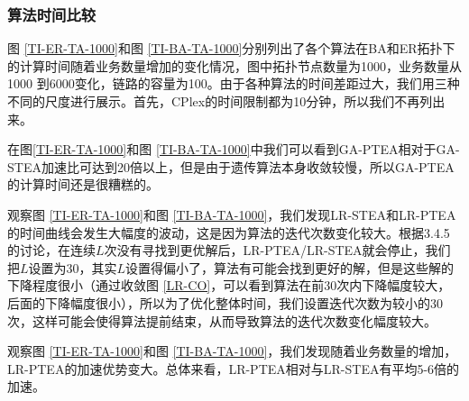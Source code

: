 \subsubsection{算法时间比较}
图 \ref{TI-ER-TA-1000}和图 \ref{TI-BA-TA-1000}分别列出了各个算法在BA和ER拓扑下的计算时间随着业务数量增加的变化情况，图中拓扑节点数量为1000，业务数量从1000 到6000变化，链路的容量为100。由于各种算法的时间差距过大，我们用三种不同的尺度进行展示。首先，CPlex的时间限制都为10分钟，所以我们不再列出来。

在图\ref{TI-ER-TA-1000}和图 \ref{TI-BA-TA-1000}中我们可以看到GA-PTEA相对于GA-STEA加速比可达到20倍以上，但是由于遗传算法本身收敛较慢，所以GA-PTEA的计算时间还是很糟糕的。

观察图 \ref{TI-ER-TA-1000}和图 \ref{TI-BA-TA-1000}，我们发现LR-STEA和LR-PTEA的时间曲线会发生大幅度的波动，这是因为算法的迭代次数变化较大。根据3.4.5的讨论，在连续$L$次没有寻找到更优解后，LR-PTEA/LR-STEA就会停止，我们把$L$设置为30，其实$L$设置得偏小了，算法有可能会找到更好的解，但是这些解的下降程度很小（通过收敛图 \ref{LR-CO}，可以看到算法在前30次内下降幅度较大，后面的下降幅度很小），所以为了优化整体时间，我们设置迭代次数为较小的30次，这样可能会使得算法提前结束，从而导致算法的迭代次数变化幅度较大。

观察图 \ref{TI-ER-TA-1000}和图 \ref{TI-BA-TA-1000}，我们发现随着业务数量的增加，LR-PTEA的加速优势变大。总体来看，LR-PTEA相对与LR-STEA有平均5-6倍的加速。

